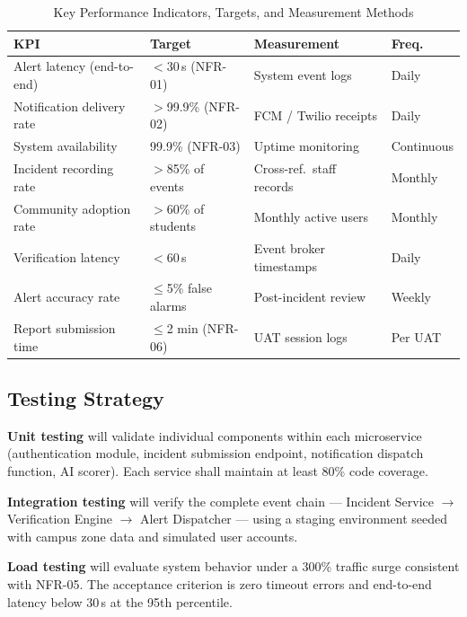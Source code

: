 \documentclass[12pt, oneside]{article}
\begin{document}
\begin{table}[H]
\caption{Key Performance Indicators, Targets, and Measurement Methods}
\label{tab:kpis}
\renewcommand{\arraystretch}{1.2}
\centering
\begin{tabular}{L{4.2cm} L{3.0cm} L{3.4cm} L{1.8cm}}
\toprule
\textbf{KPI} & \textbf{Target} & \textbf{Measurement} & \textbf{Freq.} \\
\midrule
Alert latency (end-to-end) & $<$30\,s (NFR-01)  & System event logs        & Daily      \\
Notification delivery rate & $>$99.9\% (NFR-02) & FCM / Twilio receipts    & Daily      \\
System availability        & 99.9\% (NFR-03)    & Uptime monitoring        & Continuous \\
Incident recording rate    & $>$85\% of events  & Cross-ref.\ staff records & Monthly   \\
Community adoption rate    & $>$60\% of students & Monthly active users     & Monthly    \\
Verification latency       & $<$60\,s           & Event broker timestamps  & Daily      \\
Alert accuracy rate        & $\leq$5\% false alarms & Post-incident review  & Weekly     \\
Report submission time     & $\leq$2 min (NFR-06) & UAT session logs       & Per UAT    \\
\bottomrule
\end{tabular}
\end{table}

\subsection{Testing Strategy}
\label{sec:testing}

\textbf{Unit testing} will validate individual components within each microservice
(authentication module, incident submission endpoint, notification dispatch function,
AI scorer). Each service shall maintain at least 80\% code coverage.

\textbf{Integration testing} will verify the complete event chain --- Incident Service
$\rightarrow$ Verification Engine $\rightarrow$ Alert Dispatcher --- using a staging
environment seeded with campus zone data and simulated user accounts.

\textbf{Load testing} will evaluate system behavior under a 300\% traffic surge
consistent with NFR-05. The acceptance criterion is zero timeout errors and
end-to-end latency below 30\,s at the 95th percentile.
\end{document}
